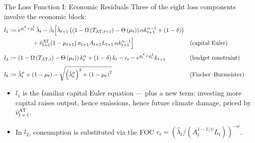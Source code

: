 \documentclass[aspectratio=169,11pt]{beamer}
\newcommand{\emphc}[1]{\textcolor{harvardcrimson}{#1}}
\begin{document}
\begin{frame}{The Loss Function I: Economic Residuals}
\small
Three of the eight loss components involve the economic block:
{\footnotesize
\begin{align*}
l_1 &:= e^{g^{A}_{t}+g^{L}_{t}}\hat{\lambda}_t - \hat{\beta}_t \Bigl[\hat{\lambda}_{t+1} \left(\left(1 - \Omega\left(T_{\text{AT},t+1}\right)-\Theta\left(\mu_{t}\right)\right) \alpha k^{\alpha-1}_{t+1} + \left(1-\delta\right) \right) \\
&\qquad\qquad + \hat{\nu}_{t+1}^{\text{AT}} (1-\mu_{t+1})\, \sigma_{t+1} A_{t+1}L_{t+1}\, \alpha k^{\alpha-1}_{t+1} \Bigr]
&& \text{(capital Euler)} \\[4pt]
l_2 &:= \left(1 - \Omega\left(T_{\text{AT},t}\right)-\Theta\left(\mu_{t}\right)\right)k_{t}^{\alpha}
    + \left(1-\delta\right)k_{t}
    - c_{t} - e^{g^{A}_{t}+g^{L}_{t}}k_{t+1}
&& \text{(budget constraint)} \\[4pt]
l_8 &:= \hat{\lambda}^{\mu}_{t} + \left(1 - \mu_{t}\right) -
  \sqrt{\left(\hat{\lambda}^{\mu}_{t} \right)^2 + \left(1-\mu_{t}\right)^{2}}
&& \text{(Fischer--Burmeister)}
\end{align*}}

\vspace{0.2cm}
\begin{itemize}
    \item $l_1$ is the familiar capital Euler equation --- \emphc{plus a new term}: investing more capital raises output, hence emissions, hence future climate damage, priced by $\hat{\nu}^{\text{AT}}_{t+1}$.
    \item In $l_2$, consumption is substituted via the FOC $c_t = \left(\hat{\lambda}_t / (A_{t}^{1-1/\psi}L_{t})\right)^{-\psi}$.
\end{itemize}
\end{frame}
\end{document}
